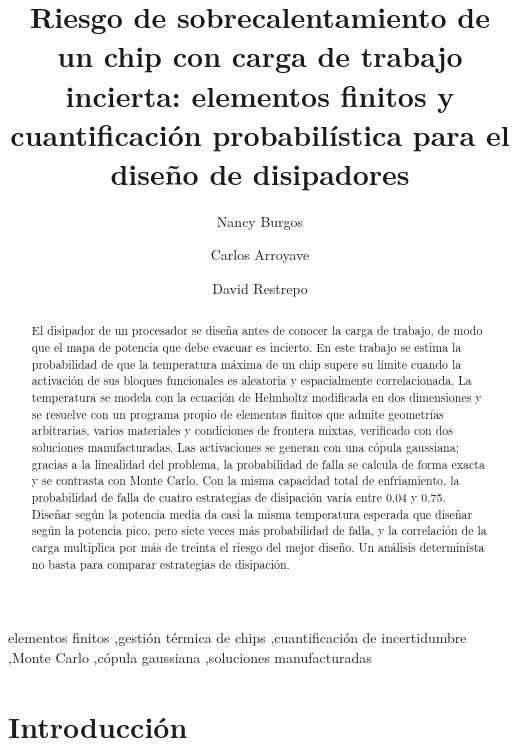 \documentclass[preprint,11pt,sort&compress]{elsarticle}
\begin{document}
\begin{frontmatter}

\title{Riesgo de sobrecalentamiento de un chip con carga de trabajo incierta:
elementos finitos y cuantificación probabilística para el diseño de disipadores}

\author{Nancy Burgos}
\author{Carlos Arroyave}
\author{David Restrepo}
\address{Escuela de Ciencias Aplicadas e Ingeniería, Universidad EAFIT, Medellín, Colombia}

\begin{abstract}
El disipador de un procesador se diseña antes de conocer la carga de trabajo, de modo que
el mapa de potencia que debe evacuar es incierto. En este trabajo se estima la probabilidad
de que la temperatura máxima de un chip supere su límite cuando la activación de sus bloques
funcionales es aleatoria y espacialmente correlacionada. La temperatura se modela con la
ecuación de Helmholtz modificada en dos dimensiones y se resuelve con un programa propio de
elementos finitos que admite geometrías arbitrarias, varios materiales y condiciones de
frontera mixtas, verificado con dos soluciones manufacturadas. Las activaciones se generan
con una cópula gaussiana; gracias a la linealidad del problema, la probabilidad de falla se
calcula de forma exacta y se contrasta con Monte Carlo. Con la misma capacidad total de
enfriamiento, la probabilidad de falla de cuatro estrategias de disipación varía entre
\num{0.04} y \num{0.75}. Diseñar según la potencia media da casi la misma temperatura
esperada que diseñar según la potencia pico, pero siete veces más probabilidad de falla, y
la correlación de la carga multiplica por más de treinta el riesgo del mejor diseño. Un
análisis determinista no basta para comparar estrategias de disipación.
\end{abstract}

\begin{keyword}
elementos finitos \sep gestión térmica de chips \sep cuantificación de incertidumbre
\sep Monte Carlo \sep cópula gaussiana \sep soluciones manufacturadas
\end{keyword}

\end{frontmatter}

\section{Introducción}
\label{sec:intro}
\end{document}
